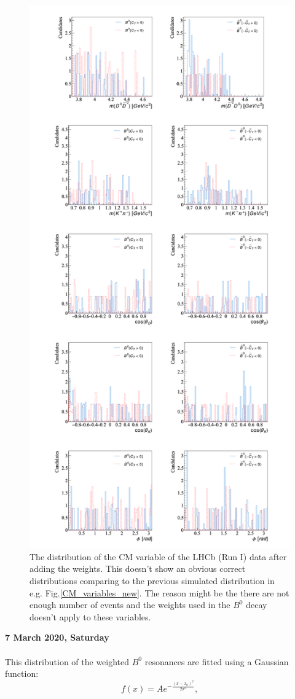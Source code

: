 \begin{figure}[h]
\center
\includegraphics*[width=0.66\linewidth]{LHCb_runI/CM_variable_all}
\caption{The distribution of the CM variable of the LHCb (Run I) data after adding the weights. This doesn't show an obvious correct distributions comparing to the previous simulated distribution in e.g. Fig.\ref{CM_variables_new}. The reason might be the there are not enough number of events and the weights used in the $B^0$ decay doesn't apply to these variables.}
\label{CM_variable_runi}
\end{figure}
\clearpage
\noindent\textbf{7 March 2020, Saturday}
\\
\\
This distribution of the weighted $B^0$ resonances are fitted using a Gaussian function:
\begin{equation}
    f(x) = Ae^{-\frac{(x-x_0)^2}{2\sigma^2}},
    \label{gaussian}
\end{equation}
